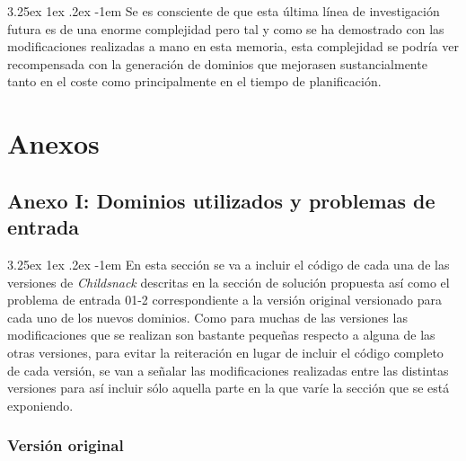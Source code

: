 \documentclass{article}
\makeatletter
\newcounter{subsubsubsection}
\renewcommand\paragraph{\@startsection{paragraph}{5}{\z@}%
      {3.25ex \@plus1ex \@minus.2ex}%
      {-1em}%
      {\normalfont\normalsize\bfseries}}
\makeatother
\begin{document}
    \paragraph{}
    Se es consciente de que esta última línea de investigación futura es de una enorme complejidad pero tal y como se ha demostrado con las modificaciones realizadas a mano en esta memoria, esta complejidad se podría ver recompensada con la generación de dominios que mejorasen sustancialmente tanto en el coste como principalmente en el tiempo de planificación.
    
    \pagebreak
    
    \section{Anexos}
    \subsection{Anexo I: Dominios utilizados y problemas de entrada}
    
    \paragraph{}
    En esta sección se va a incluir el código de cada una de las versiones de \textit{Childsnack} descritas en la sección de solución propuesta así como el problema de entrada 01-2 correspondiente a la versión original versionado para cada uno de los nuevos dominios. Como para muchas de las versiones las modificaciones que se realizan son bastante pequeñas respecto a alguna de las otras versiones, para evitar la reiteración en lugar de incluir el código completo de cada versión, se van a señalar las modificaciones realizadas entre las distintas versiones para así incluir sólo aquella parte en la que varíe la sección que se está exponiendo.
     
     \setcounter{subsubsubsection}{0}
    \subsubsection{Versión original}
    
    
    
    
    
    
\end{document}
